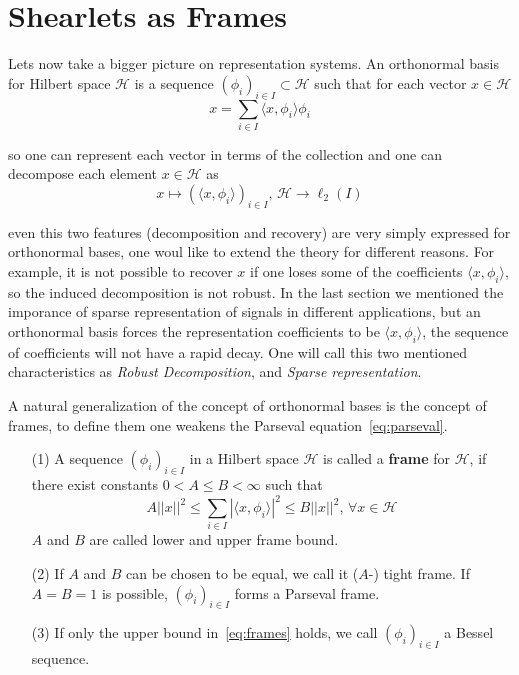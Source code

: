 \section{Shearlets as Frames}
\label{sec:ShearletsFrames}

Lets now take a bigger picture on representation systems. An orthonormal basis for Hilbert space $\mathcal{H}$ is a sequence $(\phi_i)_{i\in I}\subset\mathcal{H}$ such that for each vector $x\in\mathcal{H}$
\begin{equation}
\label{eq:parseval}
x=\sum_{i\in I}\langle x,\phi_i\rangle \phi_i
\end{equation}

so one can represent each vector in terms of the collection and one can decompose each element $x\in\mathcal{H}$ as
$$
x\mapsto (\langle x,\phi_i\rangle)_{i\in I}\text{,  }\mathcal{H}\longrightarrow \ell_2(I)
$$

even this two features (decomposition and recovery) are very simply expressed for orthonormal bases, one woul like to extend the theory for different reasons. For example, it is not possible to recover $x$ if one loses some of the coefficients $\langle x, \phi_i\rangle$, so the induced decomposition is not robust. In the last section we mentioned the imporance of sparse representation of signals in different applications, but an orthonormal basis forces the representation coefficients to be $\langle x,\phi_i\rangle$, the sequence of coefficients will not have a rapid decay. One will call this two mentioned characteristics as \textit{Robust Decomposition}, and \textit{Sparse representation}. 

\bigskip

A natural generalization of the concept of orthonormal bases is the concept of frames, to define them one weakens the Parseval equation~\ref{eq:parseval}.

\bigskip

\begin{defn}[Frames]
\label{def:frames}
\begin{enumerate}
\item[(1)] A sequence $(\phi_i)_{i\in I}$ in a Hilbert space $\mathcal{H}$ is called a \textbf{frame} for $\mathcal{H}$, if there exist constants $0<A\leq B<\infty$ such that
\begin{equation}
\label{eq:frames}
A||x||^2\leq \sum_{i\in I}|\langle x,\phi_i\rangle|^2\leq B||x||^2 \text{,  }\forall x\in \mathcal{H}
\end{equation}
$A$ and $B$ are called lower and upper frame bound.
\item[(2)] If $A$ and $B$ can be chosen to be equal, we call it ($A$-) tight frame. If $A=B=1$ is possible, $(\phi_i)_{i\in I}$ forms a Parseval frame.
\item[(3)] If only the upper bound in~\ref{eq:frames} holds, we call $(\phi_i)_{i\in I}$ a Bessel sequence.
\end{enumerate}
\end{defn}


